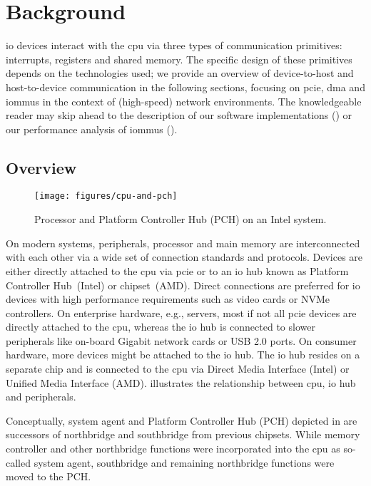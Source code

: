 \chapter{Background}
\label{chap:background}

\Ac{io} devices interact with the \acs{cpu} via three types of communication
primitives: interrupts, registers and shared memory. The specific design of
these primitives depends on the technologies used; we provide an overview of
device-to-host and host-to-device communication in the following sections,
focusing on \acs{pcie}, \acs{dma} and \acsp{iommu} in the context of
(high-speed) network environments. The knowledgeable reader may skip ahead to
the description of our software implementations () or
our performance analysis of \acp{iommu} ().


\section{Overview}
\label{sec:overview}

\begin{figure}[!b]
    \centering
    \texttt{[image: figures/cpu-and-pch]}
    \caption{Processor and Platform Controller Hub (PCH) on an Intel system.}
    \label{fig:pch}
\end{figure}

On modern systems, peripherals, processor and main memory are interconnected
with each other via a wide set of connection standards and protocols. Devices
are either directly attached to the \ac{cpu} via \ac{pcie} or to an \acs{io} hub
known as Platform Controller Hub~(Intel) or chipset~(AMD). Direct connections
are preferred for \ac{io} devices with high performance requirements such as
video cards or NVMe controllers. On enterprise hardware, e.g., servers, most if
not all \ac{pcie} devices are directly attached to the \ac{cpu}, whereas the
\ac{io} hub is connected to slower peripherals like on-board Gigabit network
cards or USB 2.0 ports. On consumer hardware, more devices might be attached to
the \ac{io} hub. The \ac{io} hub resides on a separate chip and is connected to
the \ac{cpu} via Direct Media Interface (Intel) or Unified Media Interface
(AMD).  illustrates the relationship between \ac{cpu}, \ac{io} hub
and peripherals.

Conceptually, system agent and Platform Controller Hub (PCH) depicted in
 are successors of northbridge and southbridge from previous
chipsets. While memory controller and other northbridge functions were
incorporated into the \ac{cpu} as so-called system agent, southbridge and
remaining northbridge functions were moved to the PCH.


